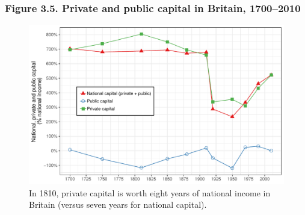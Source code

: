 \documentclass[t]{beamer}\usepackage[]{graphicx}\usepackage[]{color}
\newenvironment{knitrout}{}{} %
\begin{document}
\begin{frame}[label=Figure_3_5]
\frametitle{Figure 3.5. Private and public capital in Britain, 1700--2010}
\begin{figure}[t]
\begin{minipage}[b]{\textwidth}
\centering
\begin{knitrout}\footnotesize
{}\color{fgcolor}

{\centering \includegraphics[width=1\linewidth]{figures/color/Figure_3_5} 

}



\end{knitrout}
\caption{In 1810, private capital is worth eight years of national income in Britain (versus seven years for national capital).}
\end{minipage}
\end{figure}
\end{frame}
\end{document}
